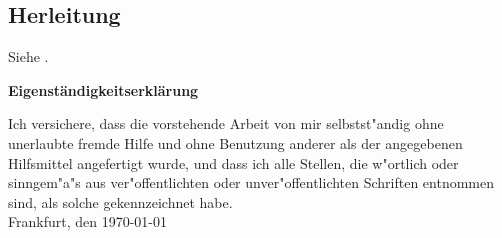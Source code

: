 \documentclass[12pt,a4paper]{article}
\begin{document}
\begin{appendix}
\section{Herleitung}
Siehe \citet{sandmann}.

\end{appendix}




\newpage
\markboth{}{}

\newpage
{} %
\renewcommand{\refname}{Literaturverzeichnis}


\newpage
\thispagestyle{empty}
\markboth{}{}
  \normalsize
\begin{center}
\huge{\bf Eigenständigkeitserklärung}\\[40mm]
\end{center}
\large
Ich versichere, dass die vorstehende Arbeit von mir selbstst"andig ohne unerlaubte fremde Hilfe und ohne Benutzung anderer als der angegebenen Hilfsmittel angefertigt wurde, und dass ich alle Stellen, die w"ortlich oder sinngem"a"s aus ver"offentlichten oder unver"offentlichten Schriften entnommen sind, als solche gekennzeichnet habe.\\[50mm]
Frankfurt, den \today

\newpage
\end{document}
